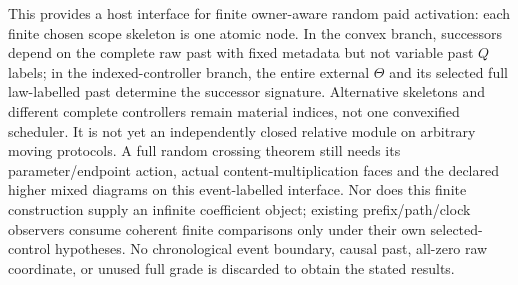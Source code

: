 \documentclass[11pt]{article}\usepackage{amsmath,amssymb,amsthm,geometry}\geometry{margin=1in}
\begin{document}
This provides a host interface for finite owner-aware random paid activation: each finite chosen scope skeleton is one atomic node. In the convex branch, successors depend on the complete raw past with fixed metadata but not variable past $Q$ labels; in the indexed-controller branch, the entire external $\Theta$ and its selected full law-labelled past determine the successor signature. Alternative skeletons and different complete controllers remain material indices, not one convexified scheduler. It is not yet an independently closed relative module on arbitrary moving protocols. A full random crossing theorem still needs its parameter/endpoint action, actual content-multiplication faces and the declared higher mixed diagrams on this event-labelled interface. Nor does this finite construction supply an infinite coefficient object; existing prefix/path/clock observers consume coherent finite comparisons only under their own selected-control hypotheses. No chronological event boundary, causal past, all-zero raw coordinate, or unused full grade is discarded to obtain the stated results.
\end{document}
